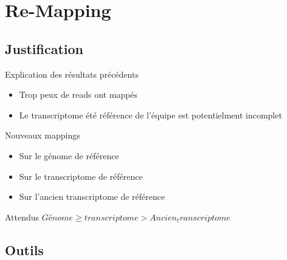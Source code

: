 \section{Re-Mapping}
\subsection{Justification}
\begin{frame}
	\tableofcontents[sectionstyle=show/shaded,subsectionstyle=show/show/hide,subsubsectionstyle=show/show/hide]
\end{frame}

\begin{frame}
    \begin{alertblock}{Explication des résultats précédents}
        \begin{itemize}
            \item Trop peux de reads ont mappés
            \item Le transcriptome été référence  de l'équipe est potentielment incomplet
        \end{itemize}
    \end{alertblock}

    \begin{alertblock}{Nouveaux mappings}
        \begin{itemize}
            \item Sur le génome de référence
            \item Sur le transcriptome de référence
            \item Sur l'ancien transcriptome de référence
        \end{itemize}
    \end{alertblock}

    \begin{alertblock}{Attendus}
        $Génome \geq transcriptome > Ancien_transcriptome$
    \end{alertblock}

\end{frame}

\subsection{Outils}

